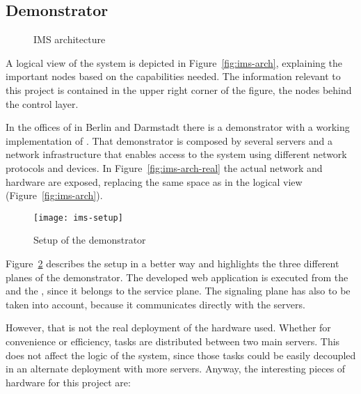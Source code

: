 \subsection{ Demonstrator} %
\label{sub:demonstrator}

\begin{figure}[htbp]
  \centering
  \caption{IMS architecture}
  \label{fig:ims}
\end{figure}

A logical view of the system is depicted in Figure~\ref{fig:ims-arch}, explaining the important nodes based on the capabilities needed.
The information relevant to this project is contained in the upper right corner of the figure, the nodes behind the control layer.

In the offices of  in Berlin and Darmstadt there is a demonstrator with a working implementation of .
That demonstrator is composed by several servers and a network infrastructure that enables access to the system using different network protocols and devices.
In Figure~\ref{fig:ims-arch-real} the actual network and hardware are exposed, replacing the same space as in the logical view (Figure~\ref{fig:ims-arch}).

\begin{figure}[htbp]
  \centering
    \texttt{[image: ims-setup]}
  \caption{Setup of the demonstrator}
  \label{fig:ims-setup}
\end{figure}

Figure~\ref{fig:ims-setup} describes the setup in a better way and highlights the three different planes of the demonstrator.
The developed web application is executed from the  and the , since it belongs to the service plane.
The signaling plane has also to be taken into account, because it communicates directly with the servers.

However, that is not the real deployment of the hardware used.
Whether for convenience or efficiency, tasks are distributed between two main servers.
This does not affect the logic of the system, since those tasks could be easily decoupled in an alternate deployment with more servers.
Anyway, the interesting pieces of hardware for this project are:

